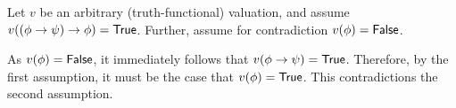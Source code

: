 \begin{note}
{    Let \(v\) be an arbitrary (truth-functional) valuation, and assume \(v((\phi \rightarrow \psi) \rightarrow \phi) = \valI{True}\).
    Further, assume for contradiction \(v(\phi) = \valI{False}\).

    As \(v(\phi) = \valI{False}\), it immediately follows that \(v(\phi \rightarrow \psi) = \valI{True}\).
    Therefore, by the first assumption, it must be the case that \(v(\phi) = \valI{True}\).
    This contradictions the second assumption.
  }






\end{note}
